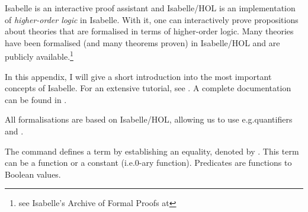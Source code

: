 %
\begin{isabellebody}%
%
%
\isadelimtheory
%
\endisadelimtheory
%
\isatagtheory
%
\endisatagtheory
{\isafoldtheory}%
%
\isadelimtheory
%
\endisadelimtheory
%
\isadelimdocument
%
\endisadelimdocument
%
\isatagdocument
%
\isamarkuptrue%
%
\endisatagdocument
{\isafolddocument}%
%
\isadelimdocument
%
\endisadelimdocument
%
\begin{isamarkuptext}%
\label{chap:isabelle}%
\end{isamarkuptext}\isamarkuptrue%
%
\begin{isamarkuptext}%
Isabelle is an interactive proof assistant and Isabelle/HOL is an implementation of \emph{higher-order logic} in Isabelle. With it, one can interactively prove propositions about theories that are formalised in terms of higher-order logic. Many theories have been formalised (and many theorems proven) in Isabelle/HOL and are publicly available.\footnote{see Isabelle's Archive of Formal Proofs at }

In this appendix, I will give a short introduction into the most important concepts of Isabelle. For an extensive tutorial, see \cite{prog_prove}. A complete documentation can be found in \cite{isar_ref}.

All formalisations are based on Isabelle/HOL, allowing us to use e.g.\@ quantifiers \isa{{\isasymforall}} and \isa{{\isasymexists}}.%
\end{isamarkuptext}\isamarkuptrue%
%
\isadelimdocument
%
\endisadelimdocument
%
\isatagdocument
%
\isamarkuptrue%
%
\endisatagdocument
{\isafolddocument}%
%
\isadelimdocument
%
\endisadelimdocument
%
\begin{isamarkuptext}%
The command  defines a term by establishing an equality, denoted by \isa{{\isasymequiv}}. This term can be a function or a constant (i.e.\@ 0-ary function). Predicates are functions to Boolean values.


\end{isamarkuptext}
\end{isabellebody}
